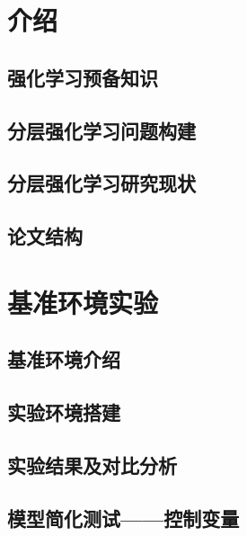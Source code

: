 \documentclass[degree=bachelor, tocarialchapter, pifootnote]{thuthesis}
\begin{document}
\frontmatter

\makecover

\setcounter{secnumdepth}{5}
\setcounter{tocdepth}{5}
\tableofcontents




\mainmatter
%
%
\chapter{介绍}
\section{强化学习预备知识}
\section{分层强化学习问题构建}
\section{分层强化学习研究现状}
\section{论文结构}



\chapter{基准环境实验}
\section{基准环境介绍}
\section{实验环境搭建}
\section{实验结果及对比分析}
\section{模型简化测试——控制变量}
\end{document}

